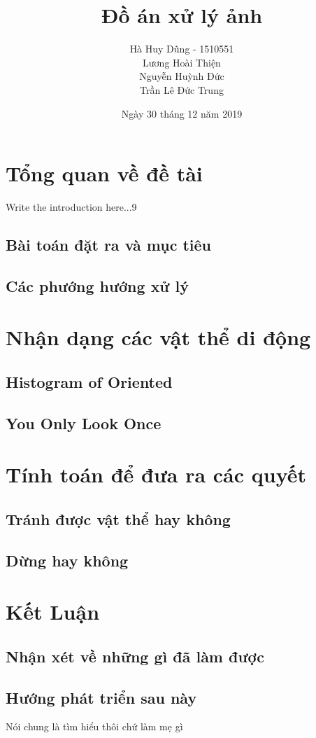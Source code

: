 \documentclass[a4paper,10pt]{article}
\title{Đồ án xử lý ảnh}
\author{Hà Huy Dũng - 1510551 \\Lương Hoài Thiện \\Nguyễn Huỳnh Đức \\Trần Lê Đức Trung}
\date{Ngày 30 tháng 12 năm 2019}
\begin{document}
\maketitle
\section{Tổng quan về đề tài}
Write the introduction here...9
	\subsection{Bài toán đặt ra và mục tiêu}
	\subsection{Các phướng hướng xử lý}
\section{Nhận dạng các vật thể di động}
    \subsection{Histogram of Oriented}
	\subsection{You Only Look Once}
\section{Tính toán để đưa ra các quyết }
	\subsection{Tránh được vật thể hay không}
	\subsection{Dừng hay không}
\section{Kết Luận}
    \subsection{Nhận xét về những gì đã làm được}
    \subsection{Hướng phát triển sau này}
Nói chung là tìm hiểu thôi chứ làm mẹ gì
\end{document}

